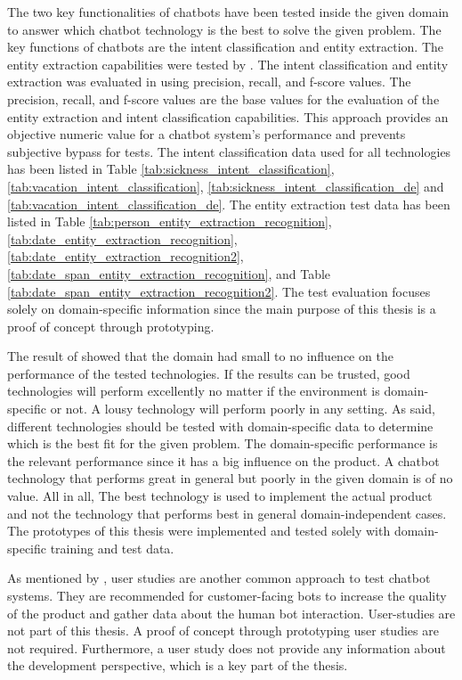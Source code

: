 The two key functionalities of chatbots have been tested inside the given domain to answer which chatbot technology is the best to solve the given problem.
The key functions of chatbots are the intent classification and entity extraction.
The entity extraction capabilities were tested by \citet{geyer2016named}.
The intent classification and entity extraction was evaluated in \citet{braunEvaluatingNLU} using precision, recall, and f-score values.
The precision, recall, and f-score values are the base values for the evaluation of the entity extraction and intent classification capabilities.
This approach provides an objective numeric value for a chatbot system's performance and prevents subjective bypass for tests.
The intent classification data used for all technologies has been listed in 
Table \ref{tab:sickness_intent_classification},
\ref{tab:vacation_intent_classification}, \ref{tab:sickness_intent_classification_de} and \ref{tab:vacation_intent_classification_de}.
The entity extraction test data has been listed in Table \ref{tab:person_entity_extraction_recognition}, 
\ref{tab:date_entity_extraction_recognition}, \ref{tab:date_entity_extraction_recognition2}, 
\ref{tab:date_span_entity_extraction_recognition}, and Table \ref{tab:date_span_entity_extraction_recognition2}.
The test evaluation focuses solely on domain-specific information since the main purpose of this thesis is a proof of concept through prototyping.

The result of \citet{braunEvaluatingNLU} showed that the domain had small to no influence on the performance of the tested technologies.
If the results can be trusted, good technologies will perform excellently no matter if the environment is domain-specific or not.
A lousy technology will perform poorly in any setting.
As \citet{braunEvaluatingNLU} said, different technologies should be tested with domain-specific data to determine which is the best fit for the given problem.
The domain-specific performance is the relevant performance since it has a big influence on the product.
A chatbot technology that performs great in general but poorly in the given domain is of no value.
All in all, The best technology is used to implement the actual product and not the technology that performs best in general domain-independent cases.
The prototypes of this thesis were implemented and tested solely with domain-specific training and test data.

As mentioned by \citet{evaluateChatbotsShawar2007}, user studies are another common approach to test chatbot systems.
They are recommended for customer-facing bots to increase the quality of the product and gather data about the human bot interaction.
User-studies are not part of this thesis.
A proof of concept through prototyping user studies are not required.
Furthermore, a user study does not provide any information about the development perspective, which is a key part of the thesis.

